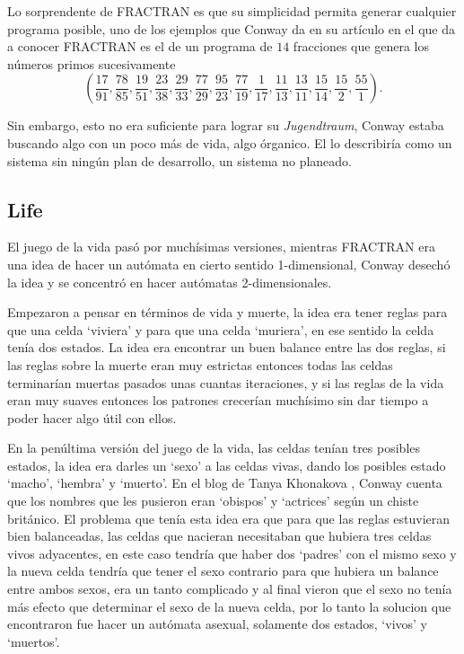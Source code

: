 Lo sorprendente de FRACTRAN es que su simplicidad permita generar cualquier programa posible, uno de los ejemplos que Conway da en su art\'iculo \cite{Conway1987} en el que da a conocer FRACTRAN es el de un programa de $14$ fracciones que genera los n\'umeros primos sucesivamente 
\[
    {\displaystyle \left({\frac {17}{91}},{\frac {78}{85}},{\frac {19}{51}},{\frac {23}{38}},{\frac {29}{33}},{\frac {77}{29}},{\frac {95}{23}},{\frac {77}{19}},{\frac {1}{17}},{\frac {11}{13}},{\frac {13}{11}},{\frac {15}{14}},{\frac {15}{2}},{\frac {55}{1}}\right)}.
\]

Sin embargo, esto no era suficiente para lograr su \textit{Jugendtraum}, Conway estaba buscando algo con un poco m\'as de vida, algo \'organico. El lo describir\'ia como un sistema sin ning\'un plan de desarrollo, un sistema no planeado.

\subsection{Life}

El juego de la vida pas\'o por much\'isimas versiones, mientras FRACTRAN era una idea de hacer un aut\'omata en cierto sentido 1-dimensional, Conway desech\'o la idea y se concentr\'o en hacer aut\'omatas 2-dimensionales.

Empezaron a pensar en t\'erminos de vida y muerte, la idea era tener reglas para que una celda `viviera' y para que una celda `muriera', en ese sentido la celda ten\'ia dos estados. La idea era encontrar un buen balance entre las dos reglas, si las reglas sobre la muerte eran muy estrictas entonces todas las celdas terminar\'ian muertas pasados unas cuantas iteraciones, y si las reglas de la vida eran muy suaves entonces los patrones crecer\'ian much\'isimo sin dar tiempo a poder hacer algo \'util con ellos.

En la pen\'ultima versi\'on del juego de la vida, las celdas ten\'ian tres posibles estados, la idea era darles un `sexo' a las celdas vivas, dando los posibles estado `macho', `hembra' y `muerto'. En el blog de Tanya Khonakova \cite{blog:tanyakhovanova}, Conway cuenta que los nombres que les pusieron eran `obispos' y `actrices' seg\'un un chiste brit\'anico. El problema que ten\'ia esta idea era que para que las reglas estuvieran bien balanceadas, las celdas que nacieran necesitaban que hubiera tres celdas vivos adyacentes, en este caso tendr\'ia que haber dos `padres' con el mismo sexo y la nueva celda tendr\'ia que tener el sexo contrario para que hubiera un balance entre ambos sexos, era un tanto complicado y al final vieron que el sexo no ten\'ia m\'as efecto que determinar el sexo de la nueva celda, por lo tanto la solucion que encontraron fue hacer un aut\'omata asexual, solamente dos estados, `vivos' y `muertos'.

